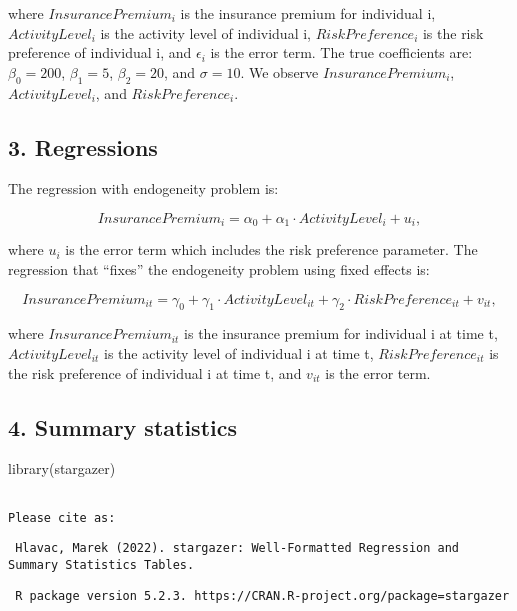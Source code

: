 \documentclass[
  letterpaper,
  DIV=11,
  numbers=noendperiod]{scrartcl}
\newenvironment{Shaded}{\begin{snugshade}}{\end{snugshade}}
\newcommand{\FunctionTok}[1]{\textcolor[rgb]{0.28,0.35,0.67}{#1}}
\newcommand{\NormalTok}[1]{\textcolor[rgb]{0.00,0.23,0.31}{#1}}
\begin{document}
where \(InsurancePremium_i\) is the insurance premium for individual i,
\(ActivityLevel_i\) is the activity level of individual i,
\(RiskPreference_i\) is the risk preference of individual i, and
\(\epsilon_i\) is the error term. The true coefficients are:
\(\beta_0 = 200\), \(\beta_1 = 5\), \(\beta_2 = 20\), and
\(\sigma = 10\). We observe \(InsurancePremium_i\), \(ActivityLevel_i\),
and \(RiskPreference_i\).

\subsection{3. Regressions}\label{regressions}

The regression with endogeneity problem is:

\[InsurancePremium_i = \alpha_0 + \alpha_1\cdot ActivityLevel_i + u_i,\]

where \(u_i\) is the error term which includes the risk preference
parameter. The regression that ``fixes'' the endogeneity problem using
fixed effects is:

\[InsurancePremium_{it} = \gamma_0 + \gamma_1\cdot ActivityLevel_{it} + \gamma_2\cdot RiskPreference_{it} + v_{it},\]

where \(InsurancePremium_{it}\) is the insurance premium for individual
i at time t, \(ActivityLevel_{it}\) is the activity level of individual
i at time t, \(RiskPreference_{it}\) is the risk preference of
individual i at time t, and \(v_{it}\) is the error term.

\subsection{4. Summary statistics}\label{summary-statistics}

\begin{Shaded}
\begin{Highlighting}[]
\FunctionTok{library}\NormalTok{(stargazer)}
\end{Highlighting}
\end{Shaded}

\begin{verbatim}

Please cite as: 
\end{verbatim}

\begin{verbatim}
 Hlavac, Marek (2022). stargazer: Well-Formatted Regression and Summary Statistics Tables.
\end{verbatim}

\begin{verbatim}
 R package version 5.2.3. https://CRAN.R-project.org/package=stargazer 
\end{verbatim}
\end{document}
